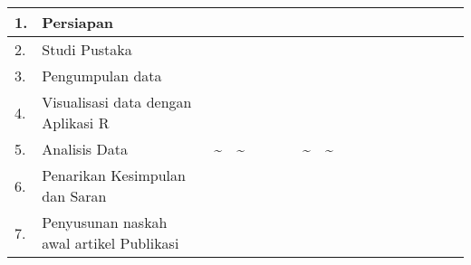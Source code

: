 \documentclass[../graphandtab.tex]{subfiles}
\begin{document}
\begin{table}[!ht]
\begin{tabular}{|p{1.5em}|p{9em}|l|l|l|l|l|l|l|l|l|l|l|l|}
		1.                            &  Persiapan                                 &                                           &              &              &  \cellcolor{blue!25}  &                       &                       &                       &                       &                       &                       &                       &  \\ \hline
		2.                            &  Studi Pustaka                             &                                           &              &              &                       &  \cellcolor{blue!25}  &                       &                       &                       &                       &                       &                       &  \\ \hline
		3.                            &  Pengumpulan data                          &                                           &              &              &                       &                       &  \cellcolor{blue!25}  &                       &                       &                       &                       &                       &  \\ \hline
		4.                            &  Visualisasi data dengan Aplikasi R        &                                           &              &              &                       &                       &  \cellcolor{blue!25}  &  \cellcolor{blue!25}  &  \cellcolor{blue!25}  &                       &                       &                       &  \\ \hline
		5.                            &  Analisis Data                             &  \~                                       &  \~          &  ~           &  ~                    &  \~                   &  \~                   &  \cellcolor{blue!25}  &  \cellcolor{blue!25}  &                       &                       &                       &  \\ \hline
		6.                            &  Penarikan Kesimpulan dan Saran            &  ~                                        &  ~           &  ~           &  ~                    &  ~                    &  ~                    &  ~                    &  ~                    &  \cellcolor{blue!25}  &  ~                    &  ~                    &  ~  \\ \hline
		7.                            &  Penyusunan naskah awal artikel Publikasi  &  ~                                        &  ~           &  ~           &  ~                    &  ~                    &  ~                    &  ~                    &  ~                    &  \cellcolor{blue!25}  &  \cellcolor{blue!25}  &  ~                    &  ~  \\ \hline

\end{tabular}
\end{table}
\end{document}
